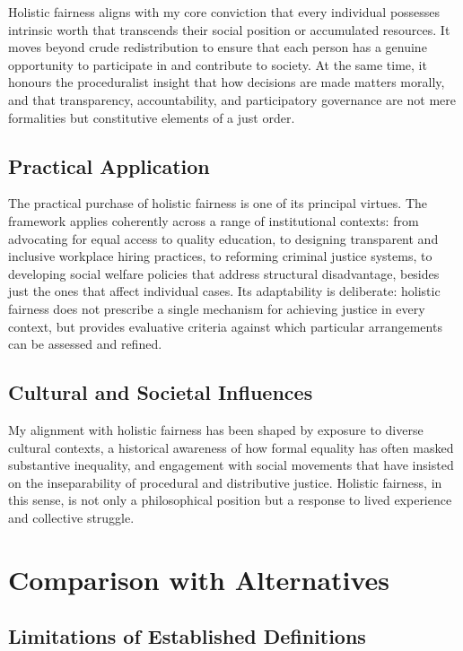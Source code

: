 \documentclass[11pt,showkeys]{../../shared/essay}
\begin{document}
Holistic fairness aligns with my core conviction that every individual possesses intrinsic worth that transcends their social position or accumulated resources. It moves beyond crude redistribution to ensure that each person has a genuine opportunity to participate in and contribute to society. At the same time, it honours the proceduralist insight that how decisions are made matters morally, and that transparency, accountability, and participatory governance are not mere formalities but constitutive elements of a just order.

\subsection{Practical Application}

The practical purchase of holistic fairness is one of its principal virtues. The framework applies coherently across a range of institutional contexts: from advocating for equal access to quality education, to designing transparent and inclusive workplace hiring practices, to reforming criminal justice systems, to developing social welfare policies that address structural disadvantage, besides just the ones that affect individual cases. Its adaptability is deliberate: holistic fairness does not prescribe a single mechanism for achieving justice in every context, but provides evaluative criteria against which particular arrangements can be assessed and refined.

\subsection{Cultural and Societal Influences}

My alignment with holistic fairness has been shaped by exposure to diverse cultural contexts, a historical awareness of how formal equality has often masked substantive inequality, and engagement with social movements that have insisted on the inseparability of procedural and distributive justice. Holistic fairness, in this sense, is not only a philosophical position but a response to lived experience and collective struggle.

\section{Comparison with Alternatives}

\subsection{Limitations of Established Definitions}
\end{document}
